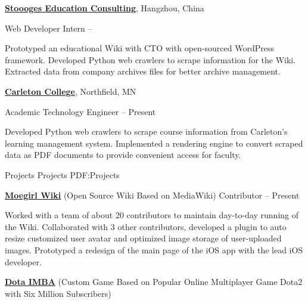 \documentclass[letterpaper,MMMyyyy,nonstopmode]{simpleresumecv}
\begin{document}
\begin{Body}
\BigGap
\Entry
\href{http://stoooges.com/en/}
{\textbf{Stoooges Education Consulting}},
Hangzhou, China


\Gap
\BulletItem
Web Developer Intern
\hfill
{} --
\begin{Detail}
\SubBulletItem
Prototyped an educational Wiki with CTO with open-sourced WordPress framework.
\SubBulletItem
Developed Python web crawlers to scrape information for the Wiki.
\SubBulletItem
Extracted data from company archives files for better archive management.
\end{Detail}

\BigGap
\Entry
\href{https://www.carleton.edu/}
{\textbf{Carleton College}},
Northfield, MN

\Gap
\BulletItem
Academic Technology Engineer
\hfill
{} --
Present
\begin{Detail}
\SubBulletItem
Developed Python web crawlers to scrape course information from Carleton’s learning management system.
\SubBulletItem
Implemented a rendering engine to convert scraped data as PDF documents to provide convenient access for faculty.
\end{Detail}


\Section
{Projects}
{Projects}
{PDF:Projects}

\Entry
\href{https://moegirl.org/Mainpage}
{\textbf{Moegirl Wiki}}
\newline
(Open Source Wiki Based on MediaWiki)
\Gap
\BulletItem
Contributor
\hfill
{} --
Present
\begin{Detail}
\SubBulletItem
Worked with a team of about 20 contributors to maintain day-to-day running of the Wiki.
\SubBulletItem
Collaborated with 3 other contributors, developed a plugin to auto resize customized user avatar and optimized image storage of user-uploaded images.
\SubBulletItem
Prototyped a redesign of the main page of the iOS app with the lead iOS developer.
\end{Detail}

\BigGap
\Entry
\href{https://steamcommunity.com/sharedfiles/filedetails/?id=440115357}
{\textbf{Dota IMBA}}
\newline
(Custom Game Based on Popular Online Multiplayer Game Dota2 with Six Million Subscribers)


\end{Body}
\end{document}

